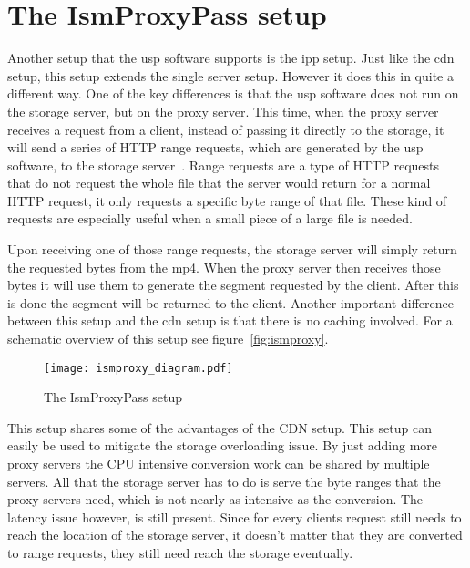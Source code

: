 \documentclass[twoside,openright]{uva-bachelor-thesis}
\begin{document}
\section{The IsmProxyPass setup}
Another setup that the \gls{usp} software supports is the \gls{ipp} setup. Just
like the \gls{cdn} setup, this setup extends the single server setup. However it
does this in quite a different way. One of the key differences is that the
\gls{usp} software does not run on the storage server, but on the proxy server.
This time, when the proxy server receives a request from a client, instead of
passing it directly to the storage, it will send a series of HTTP range
requests, which are generated by the \gls{usp} software, to the storage
server~\autocite{rangerequests}. Range requests are a type of
HTTP requests that do not request the whole file that the server would return
for a normal HTTP request, it only requests a specific byte range of that file.
These kind of requests are especially useful when a small piece of a large file
is needed.

Upon receiving one of those range requests, the storage server will simply
return the requested bytes from the mp4. When the proxy server then receives
those bytes it will use them to generate the segment requested by the client.
After this is done the segment will be returned to the client. Another important
difference between this setup and the \gls{cdn} setup is that there is no
caching involved.  For a schematic overview of this setup see
figure~\vref{fig:ismproxy}.

\begin{figure}
    \texttt{[image: ismproxy\_diagram.pdf]}
    \caption{The IsmProxyPass setup}\label{fig:ismproxy}
\end{figure}

This setup shares some of the advantages of the CDN setup. This setup can easily
be used to mitigate the storage overloading issue. By just adding more proxy
servers the CPU intensive conversion work can be shared by multiple servers. All
that the storage server has to do is serve the byte ranges that the proxy
servers need, which is not nearly as intensive as the conversion. The latency
issue however, is still present. Since for every clients request still needs to
reach the location of the storage server, it doesn't matter that they are
converted to range requests, they still need reach the storage eventually.
\end{document}
